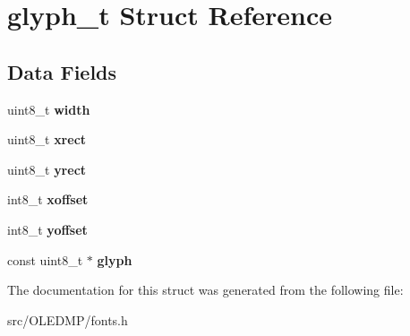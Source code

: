 \hypertarget{structglyph__t}{}\section{glyph\+\_\+t Struct Reference}
\label{structglyph__t}
\subsection*{Data Fields}
\begin{DoxyCompactItemize}
\item 
uint8\+\_\+t {\bfseries width}\hypertarget{structglyph__t_a09a2a45f731b02946ff6d3cd15c1a476}{}\label{structglyph__t_a09a2a45f731b02946ff6d3cd15c1a476}

\item 
uint8\+\_\+t {\bfseries xrect}\hypertarget{structglyph__t_a46d1f5dd7c1a75b29bd8ff4572263129}{}\label{structglyph__t_a46d1f5dd7c1a75b29bd8ff4572263129}

\item 
uint8\+\_\+t {\bfseries yrect}\hypertarget{structglyph__t_a59c390ac18717a7ff28f85cc8a829a8e}{}\label{structglyph__t_a59c390ac18717a7ff28f85cc8a829a8e}

\item 
int8\+\_\+t {\bfseries xoffset}\hypertarget{structglyph__t_a248c78bc36899ea7581e379d926f480a}{}\label{structglyph__t_a248c78bc36899ea7581e379d926f480a}

\item 
int8\+\_\+t {\bfseries yoffset}\hypertarget{structglyph__t_a1f3726a53d108483e5f64b4cf1edda88}{}\label{structglyph__t_a1f3726a53d108483e5f64b4cf1edda88}

\item 
const uint8\+\_\+t $\ast$ {\bfseries glyph}\hypertarget{structglyph__t_a2bad71d1abe181892d7ec3a7223b0035}{}\label{structglyph__t_a2bad71d1abe181892d7ec3a7223b0035}

\end{DoxyCompactItemize}


The documentation for this struct was generated from the following file\+:\begin{DoxyCompactItemize}
\item 
src/\+O\+L\+E\+D\+M\+P/fonts.\+h\end{DoxyCompactItemize}
